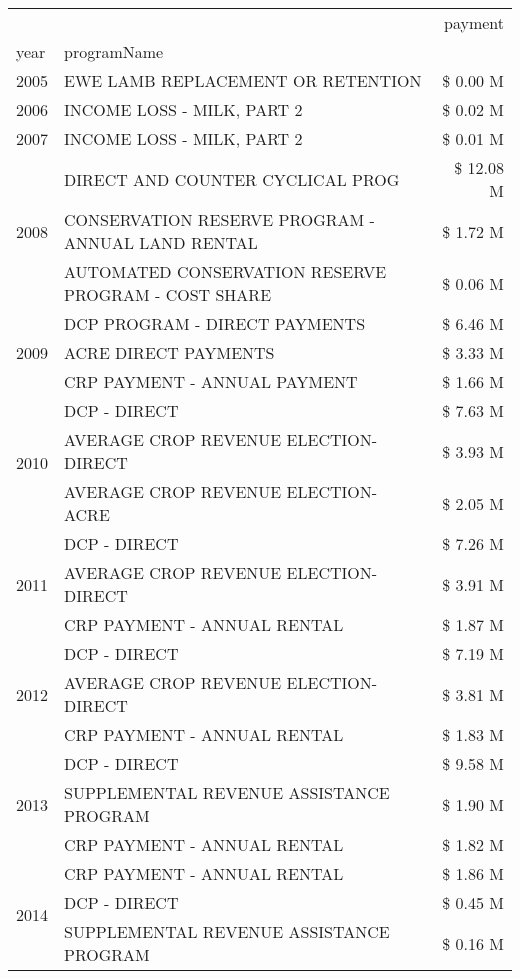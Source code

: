 \begin{tabular}{llr}
\toprule
 &  & payment \\
year & programName &  \\
\midrule
2005 & EWE LAMB REPLACEMENT OR RETENTION & \$ 0.00 M \\
\cline{1-3}
2006 & INCOME LOSS - MILK, PART 2 & \$ 0.02 M \\
\cline{1-3}
2007 & INCOME LOSS - MILK, PART 2 & \$ 0.01 M \\
\cline{1-3}
\multirow[t]{3}{*}{2008} & DIRECT AND COUNTER CYCLICAL PROG & \$ 12.08 M \\
 & CONSERVATION RESERVE PROGRAM - ANNUAL LAND RENTAL & \$ 1.72 M \\
 & AUTOMATED CONSERVATION RESERVE PROGRAM - COST SHARE & \$ 0.06 M \\
\cline{1-3}
\multirow[t]{3}{*}{2009} & DCP PROGRAM - DIRECT PAYMENTS & \$ 6.46 M \\
 & ACRE DIRECT PAYMENTS & \$ 3.33 M \\
 & CRP PAYMENT - ANNUAL PAYMENT & \$ 1.66 M \\
\cline{1-3}
\multirow[t]{3}{*}{2010} & DCP - DIRECT & \$ 7.63 M \\
 & AVERAGE CROP REVENUE ELECTION-DIRECT & \$ 3.93 M \\
 & AVERAGE CROP REVENUE ELECTION-ACRE & \$ 2.05 M \\
\cline{1-3}
\multirow[t]{3}{*}{2011} & DCP - DIRECT & \$ 7.26 M \\
 & AVERAGE CROP REVENUE ELECTION-DIRECT & \$ 3.91 M \\
 & CRP PAYMENT - ANNUAL RENTAL & \$ 1.87 M \\
\cline{1-3}
\multirow[t]{3}{*}{2012} & DCP - DIRECT & \$ 7.19 M \\
 & AVERAGE CROP REVENUE ELECTION-DIRECT & \$ 3.81 M \\
 & CRP PAYMENT - ANNUAL RENTAL & \$ 1.83 M \\
\cline{1-3}
\multirow[t]{3}{*}{2013} & DCP - DIRECT & \$ 9.58 M \\
 & SUPPLEMENTAL REVENUE ASSISTANCE PROGRAM & \$ 1.90 M \\
 & CRP PAYMENT - ANNUAL RENTAL & \$ 1.82 M \\
\cline{1-3}
\multirow[t]{3}{*}{2014} & CRP PAYMENT - ANNUAL RENTAL & \$ 1.86 M \\
 & DCP - DIRECT & \$ 0.45 M \\
 & SUPPLEMENTAL REVENUE ASSISTANCE PROGRAM & \$ 0.16 M \\
\cline{1-3}

\end{tabular}

